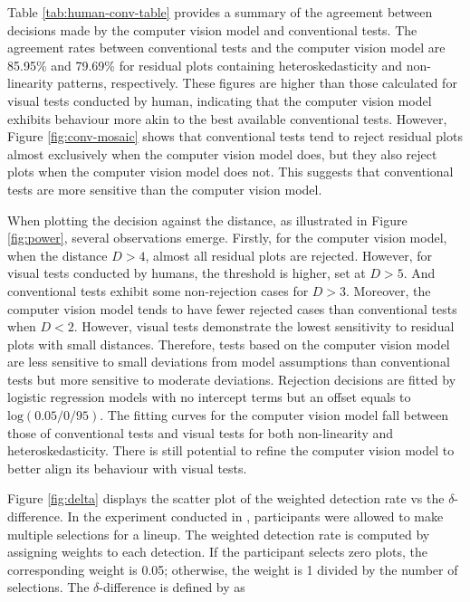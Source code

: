\documentclass[]{interact}
\theoremstyle{plain}%
\theoremstyle{definition}
\theoremstyle{remark}
\begin{document}
Table \ref{tab:human-conv-table} provides a summary of the agreement
between decisions made by the computer vision model and conventional
tests. The agreement rates between conventional tests and the computer
vision model are 85.95\% and 79.69\% for residual plots containing
heteroskedasticity and non-linearity patterns, respectively. These
figures are higher than those calculated for visual tests conducted by
human, indicating that the computer vision model exhibits behaviour more
akin to the best available conventional tests. However, Figure
\ref{fig:conv-mosaic} shows that conventional tests tend to reject
residual plots almost exclusively when the computer vision model does,
but they also reject plots when the computer vision model does not. This
suggests that conventional tests are more sensitive than the computer
vision model.

When plotting the decision against the distance, as illustrated in
Figure \ref{fig:power}, several observations emerge. Firstly, for the
computer vision model, when the distance \(D > 4\), almost all residual
plots are rejected. However, for visual tests conducted by humans, the
threshold is higher, set at \(D > 5\). And conventional tests exhibit
some non-rejection cases for \(D > 3\). Moreover, the computer vision
model tends to have fewer rejected cases than conventional tests when
\(D < 2\). However, visual tests demonstrate the lowest sensitivity to
residual plots with small distances. Therefore, tests based on the
computer vision model are less sensitive to small deviations from model
assumptions than conventional tests but more sensitive to moderate
deviations. Rejection decisions are fitted by logistic regression models
with no intercept terms but an offset equals to
\(\text{log}(0.05/0/95)\). The fitting curves for the computer vision
model fall between those of conventional tests and visual tests for both
non-linearity and heteroskedasticity. There is still potential to refine
the computer vision model to better align its behaviour with visual
tests.

Figure \ref{fig:delta} displays the scatter plot of the weighted
detection rate vs the \(\delta\)-difference. In the experiment conducted
in \citet{li2023plot}, participants were allowed to make multiple
selections for a lineup. The weighted detection rate is computed by
assigning weights to each detection. If the participant selects zero
plots, the corresponding weight is 0.05; otherwise, the weight is 1
divided by the number of selections. The \(\delta\)-difference is
defined by \citet{chowdhury2018measuring} as
\end{document}
